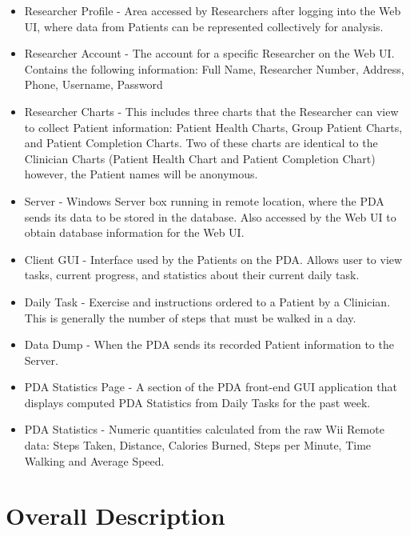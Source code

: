 \documentclass{article}
\begin{document}
\begin{itemize}
\item Researcher Profile - Area accessed by Researchers after logging into the Web UI, where data from Patients can be represented collectively for analysis.

\item Researcher Account - The account for a specific Researcher on the Web UI. Contains the following information: Full Name, Researcher Number, Address, Phone, Username, Password

\item Researcher Charts - This includes three charts that the Researcher can view to collect Patient information: Patient Health Charts, Group Patient Charts, and Patient Completion Charts. Two of these charts are identical to the Clinician Charts (Patient Health Chart and Patient Completion Chart) however, the Patient names will be anonymous. 

\item Server - Windows Server box running in remote location, where the PDA sends its data to be stored in the database. Also accessed by the Web UI to obtain database information for the Web UI.

\item Client GUI - Interface used by the Patients on the PDA. Allows user to view tasks, current progress, and statistics about their current daily task.

\item Daily Task - Exercise and instructions ordered to a Patient by a Clinician.  This is generally the number of steps that must be walked in a day.

\item Data Dump - When the PDA sends its recorded Patient information to the Server.

\item PDA Statistics Page - A section of the PDA front-end GUI application that displays computed PDA Statistics from Daily Tasks for the past week. 

\item PDA Statistics - Numeric quantities calculated from the raw Wii Remote data: Steps Taken, Distance, Calories Burned, Steps per Minute, Time Walking and Average Speed.  
\end{itemize}

\section{Overall Description}
\end{document}
